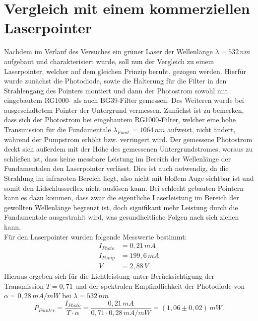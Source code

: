 \documentclass[twoside,colorback,accentcolor=tud4c,11pt]{tudreport}
\begin{document}
\section{Vergleich mit einem kommerziellen Laserpointer}
Nachdem im Verlauf des Versuches ein grüner Laser der Wellenlänge $\lambda =532\,\si{nm}$ aufgebaut und charakterisiert wurde, soll nun der Vergleich zu einem Laserpointer, welcher auf dem gleichen Prinzip beruht, gezogen werden. Hierfür wurde zunächst die Photodiode, sowie die Halterung für die Filter in den Strahlengang des Pointers montiert und dann der Photostrom sowohl mit eingebautem RG1000- als auch BG39-Filter gemessen. Des Weiteren wurde bei ausgeschaltetem Pointer der Untergrund vermessen.
Zunächst ist zu bemerken, dass sich der Photostrom bei eingebautem RG1000-Filter, welcher eine hohe Transmission für die Fundamentale $\lambda_{Fund.}=1064\,\si{nm}$ aufweist, nicht ändert, während der Pumpstrom erhöht bzw. verringert wird. Der gemessene Photostrom deckt sich außerdem mit der Höhe des gemessenen Untergrundstromes, woraus zu schließen ist, dass keine messbare Leistung im Bereich der Wellenlänge der Fundamentalen den Laserpointer verlässt. Dies ist auch notwendig, da die Strahlung im infraroten Bereich liegt, also nicht mit bloßem Auge sichtbar ist und somit den Lidschlussreflex nicht auslösen kann. Bei schlecht gebauten Pointern kann es dazu kommen, dass zwar die eigentliche Laserleistung im Bereich der gewollten Wellenlänge begrenzt ist, doch signifikant mehr Leistung durch die Fundamentale ausgestrahlt wird, was gesundheitliche Folgen nach sich ziehen kann.\\
Für den Laserpointer wurden folgende Messwerte bestimmt:
\begin{align}
I_{Photo}&=0,21\,\si{mA}\\
I_{Pump}&=199,6\,\si{mA}\\
V&=2,88\,\si{V}
\end{align}
Hieraus ergeben sich für die Lichtleistung unter Berücksichtigung der Transmission $T=0,71$ und der spektralen Empfindlichkeit der Photodiode von $\alpha =0,28\,\si{mA/mW}$ bei $\lambda =532\,\si{nm}$ 
\begin{equation}
P_{Pointer}=\frac{I_{Photo}}{T\cdot\alpha}=\frac{0,21\,\si{mA}}{0,71\cdot 0,28\,\si{mA/mW}}=(1,06\pm 0,02) \,\si{mW}.
\end{equation}
\end{document}
